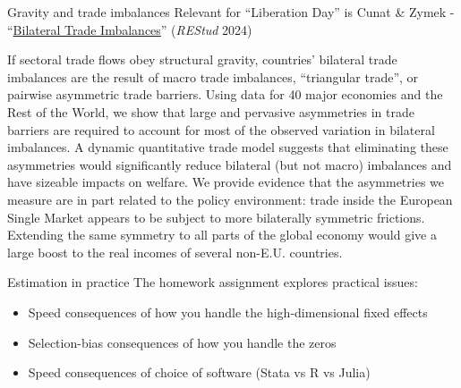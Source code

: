 \documentclass[10pt,notes=hide,aspectratio=169]{beamer}
\begin{document}
\begin{frame}{Gravity and trade imbalances}
Relevant for ``Liberation Day'' is
Cunat \& Zymek - ``\href{https://doi.org/10.1093/restud/rdad052}{Bilateral Trade Imbalances}'' (\textit{REStud} 2024)
{\small
	If sectoral trade flows obey structural gravity, countries' bilateral trade imbalances are the result of macro trade imbalances, “triangular trade”, or pairwise asymmetric trade barriers. Using data for 40 major economies and the Rest of the World, we show that large and pervasive asymmetries in trade barriers are required to account for most of the observed variation in bilateral imbalances. A dynamic quantitative trade model suggests that eliminating these asymmetries would significantly reduce bilateral (but not macro) imbalances and have sizeable impacts on welfare. We provide evidence that the asymmetries we measure are in part related to the policy environment: trade inside the European Single Market appears to be subject to more bilaterally symmetric frictions. Extending the same symmetry to all parts of the global economy would give a large boost to the real incomes of several non-E.U. countries.
\par}
\end{frame}
\begin{frame}{Estimation in practice}
The homework assignment explores practical issues:
\begin{itemize}
\item Speed consequences of how you handle the high-dimensional fixed effects
\item Selection-bias consequences of how you handle the zeros
\item Speed consequences of choice of software (Stata vs R vs Julia)
\end{itemize}
\end{frame}
\end{document}
